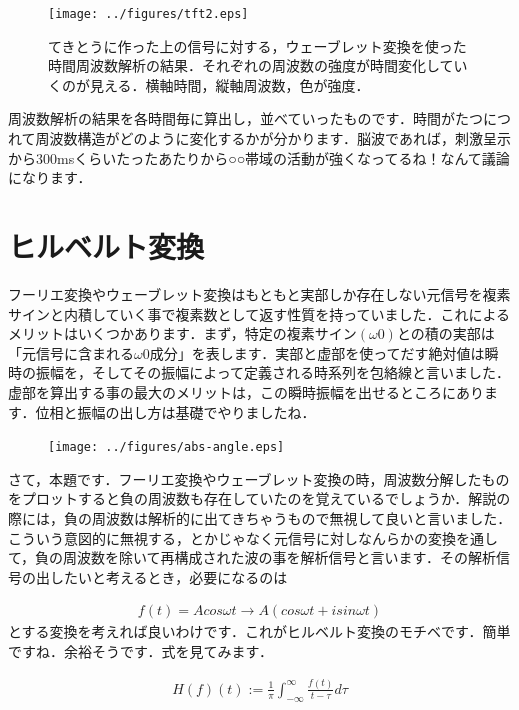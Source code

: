 \documentclass[11pt,a4paper]{ujreport} 	%
\begin{document}
\begin{figure}[H]
  \centering
  \texttt{[image: ../figures/tft2.eps]}
  \caption{てきとうに作った上の信号に対する，ウェーブレット変換を使った時間周波数解析の結果．それぞれの周波数の強度が時間変化していくのが見える．横軸時間，縦軸周波数，色が強度．}
\end{figure}

周波数解析の結果を各時間毎に算出し，並べていったものです．時間がたつにつれて周波数構造がどのように変化するかが分かります．脳波であれば，刺激呈示から300msくらいたったあたりから○○帯域の活動が強くなってるね！なんて議論になります．

\chapter{ヒルベルト変換}
フーリエ変換やウェーブレット変換はもともと実部しか存在しない元信号を複素サインと内積していく事で複素数として返す性質を持っていました．これによるメリットはいくつかあります．まず，特定の複素サイン$(\omega 0)$との積の実部は「元信号に含まれる$\omega 0$成分」を表します．実部と虚部を使ってだす絶対値は瞬時の振幅を，そしてその振幅によって定義される時系列を包絡線と言いました．\\

虚部を算出する事の最大のメリットは，この瞬時振幅を出せるところにあります．位相と振幅の出し方は基礎でやりましたね．

\begin{figure}[H]
  \centering
  \texttt{[image: ../figures/abs-angle.eps]}
\end{figure}

さて，本題です．フーリエ変換やウェーブレット変換の時，周波数分解したものをプロットすると負の周波数も存在していたのを覚えているでしょうか．解説の際には，負の周波数は解析的に出てきちゃうもので無視して良いと言いました．こういう意図的に無視する，とかじゃなく元信号に対しなんらかの変換を通して，負の周波数を除いて再構成された波の事を解析信号と言います．その解析信号の出したいと考えるとき，必要になるのは


\begin{eqnarray}
  f(t) = Acos\omega t\rightarrow A(cos\omega t + i sin\omega t)
\end{eqnarray}
とする変換を考えれば良いわけです．これがヒルベルト変換のモチベです．簡単ですね．余裕そうです．式を見てみます．


\begin{eqnarray}
  \label{eq:hilbert1}
  H(f)(t):= \frac{1}{\pi} \int_{-\infty}^\infty \frac{f(t)}{t-\tau} d\tau
\end{eqnarray}
\end{document}
